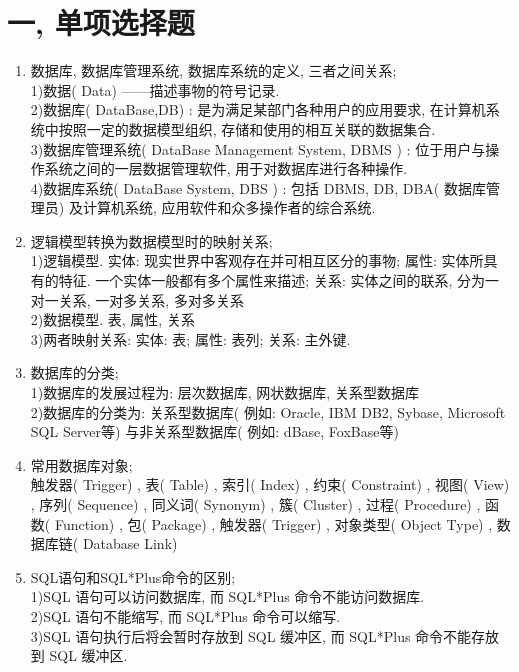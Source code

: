 \documentclass{article}                     %
\numberwithin{equation}{section}            %
\numberwithin{figure}{section}              %
\numberwithin{table}{section}               %
\begin{document}
\section{一, 单项选择题}
\begin{enumerate}
    
\item 数据库, 数据库管理系统, 数据库系统的定义, 三者之间关系; \\
1)数据( Data) ——描述事物的符号记录. \\
2)数据库( DataBase,DB) : 是为满足某部门各种用户的应用要求, 在计算机系统中按照一定的数据模型组织, 存储和使用的相互关联的数据集合. \\
3)数据库管理系统( DataBase Management System, DBMS ) : 位于用户与操作系统之间的一层数据管理软件, 用于对数据库进行各种操作. \\
4)数据库系统(  DataBase System, DBS ) : 包括 DBMS, DB, DBA( 数据库管理员) 及计算机系统, 应用软件和众多操作者的综合系统. \\


\item 逻辑模型转换为数据模型时的映射关系; \\
1)逻辑模型. 实体: 现实世界中客观存在并可相互区分的事物; 属性: 实体所具有的特征. 一个实体一般都有多个属性来描述; 关系: 实体之间的联系, 分为一对一关系, 一对多关系, 多对多关系\\
2)数据模型. 表, 属性, 关系\\
3)两者映射关系: 实体: 表; 属性: 表列; 关系: 主外键. \\



\item 数据库的分类; \\
1)数据库的发展过程为: 层次数据库, 网状数据库, 关系型数据库\\
2)数据库的分类为: 关系型数据库( 例如: Oracle, IBM DB2, Sybase, Microsoft SQL Server等) 与非关系型数据库( 例如: dBase, FoxBase等) \\




\item 常用数据库对象; \\
触发器( Trigger) , 表( Table) , 索引( Index) , 约束( Constraint) , 视图( View) , 序列( Sequence) , 同义词( Synonym) , 簇( Cluster) , 过程( Procedure) , 函数( Function) , 包( Package) , 触发器( Trigger) , 对象类型( Object Type)  , 数据库链( Database Link) \\



\item SQL语句和SQL*Plus命令的区别; \\
1)SQL 语句可以访问数据库, 而 SQL*Plus 命令不能访问数据库. \\
2)SQL 语句不能缩写, 而 SQL*Plus 命令可以缩写. \\
3)SQL 语句执行后将会暂时存放到 SQL 缓冲区, 而 SQL*Plus 命令不能存放到 SQL 缓冲区. \\


\end{enumerate}
\end{document}
